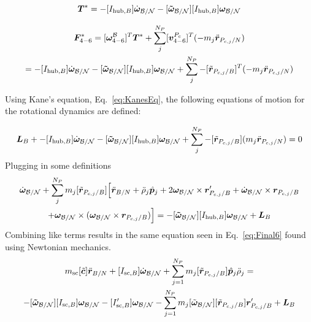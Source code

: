 \begin{equation}
	\bm T^* = -[I_{\text{hub},B}] \dot{\bm\omega}_{\cal B/N}  -[\bm{\tilde{\omega}}_{\cal B/N}] [I_{\text{hub},B}] \bm\omega_{\cal B/N}
\end{equation}

\begin{multline}
	\bm F^*_{4-6} = [\bm \omega_{4-6}^{\cal{B}}]^T \bm T^* + \sum\limits_{j}^{N_P}[\bm v^{P_c}_{4-6}]^T (-m_j \ddot{\bm r}_{P_{c,j}/N}) \\
	= -[I_{\text{hub},B}] \dot{\bm\omega}_{\cal B/N}  -[\bm{\tilde{\omega}}_{\cal B/N}] [I_{\text{hub},B}] \bm\omega_{\cal B/N} + \sum\limits_{j}^{N_P}- [\tilde{{\bm r}}_{P_{c,j}/B}]^T (-m_j \ddot{\bm r}_{P_{c,j}/N})
\end{multline}

Using Kane's equation, Eq.~\eqref{eq:KanesEq}, the following equations of motion for the rotational dynamics are defined:

\begin{equation}
	\bm L_B + -[I_{\text{hub},B}] \dot{\bm\omega}_{\cal B/N}  -[\bm{\tilde{\omega}}_{\cal B/N}] [I_{\text{hub},B}] \bm\omega_{\cal B/N} + \sum\limits_{j}^{N_P}- [\tilde{{\bm r}}_{P_{c,j}/B}] (m_j \ddot{\bm r}_{P_{c,j}/N}) = 0
\end{equation}
Plugging in some definitions
\begin{multline}
	[I_{\text{hub},B}] \dot{\bm\omega}_{\cal B/N}  + \sum\limits_{j}^{N_P} m_j [\tilde{{\bm r}}_{P_{c,j}/B}] \Big[\ddot{\bm r}_{B/N} + \ddot{\rho}_j \hat{\bm p}_j  +2 \bm\omega_{\cal B/N} \times \bm{r}'_{P_{c,j}/B} + \dot{\bm\omega}_{\cal B/N} \times \bm{r}_{P_{c,j}/B}  \\
	+\bm\omega_{\cal B/N} \times (\bm\omega_{\cal B/N} \times \bm{r}_{P_{c,j}/B})\Big] = -[\bm{\tilde{\omega}}_{\cal B/N}] [I_{\text{hub},B}] \bm\omega_{\cal B/N} + \bm L_B
\end{multline}
Combining like terms results in the same equation seen in Eq.~\eqref{eq:Final6} found using Newtonian mechanics.
\begin{multline}
	m_{\text{sc}}[\tilde{\bm{c}}]\ddot{\bm r}_{B/N}+[I_{\text{sc},B}] \dot{\bm\omega}_{\cal B/N} + \sum\limits_{j=1}^{N_P}m_j [\tilde{\bm r}_{P_{c,j}/B}] \hat{\bm p}_j \ddot{\rho}_j = \\
	-[\bm{\tilde{\omega}}_{\cal B/N}] [I_{\text{sc},B}] \bm\omega_{\cal B/N} 
	- [I'_{\text{sc},B}] \bm\omega_{\cal B/N} 	- \sum\limits_{j=1}^{N_P} m_j [\tilde{\bm\omega}_{\cal B/N}] [\tilde{\bm{r}}_{P_{c,j}/B}] \bm{r}'_{P_{c,j}/B} + \bm{L}_B
	\label{eq:Final7}
\end{multline} 

